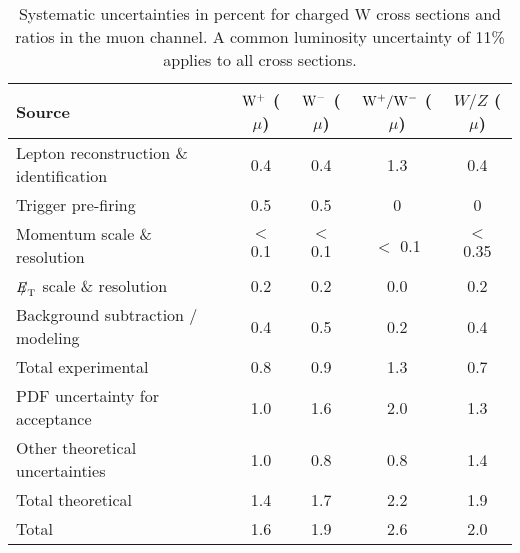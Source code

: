 \begin{table}
   \caption[.]{ \label{tab:systMU}
Systematic uncertainties in percent for charged W cross sections and ratios in the
muon channel.
A common luminosity uncertainty of 11\% applies to all cross sections. }
\begin{center}
\begin {tabular} {|l|c|c|c|c|}
\hline
Source       & $\mathrm{W^+}$ ($\mu$) & $\mathrm{W^-}$ ($\mu$) & $\mathrm{W^+}/\mathrm{W^-}$ ($\mu$) & $W/Z$ ($\mu$) \\
         \hline
Lepton reconstruction \& identification  & 0.4 & 0.4 & 1.3 & 0.4 \\
Trigger pre-firing                       & 0.5 & 0.5 & 0   & 0   \\
Momentum scale \& resolution             & $<$ 0.1 & $<$ 0.1 & $<$ 0.1 & $<$ 0.35 \\
${E\!\!\!/}_{\mathrm{T}}$ scale \& resolution               & 0.2 & 0.2 & 0.0   & 0.2 \\
Background subtraction / modeling        & 0.4 & 0.5 & 0.2 & 0.4 \\
\hline
Total experimental                       & 0.8 & 0.9 & 1.3 & 0.7 \\
\hline
PDF uncertainty for acceptance           & 1.0 & 1.6 & 2.0 & 1.3 \\
Other theoretical uncertainties          & 1.0 & 0.8 & 0.8 & 1.4 \\
\hline
Total theoretical                        & 1.4 & 1.7 & 2.2 & 1.9 \\
\hline
Total                                    & 1.6 & 1.9 & 2.6 & 2.0 \\
\hline
\end {tabular}
\end{center}
\end{table}

